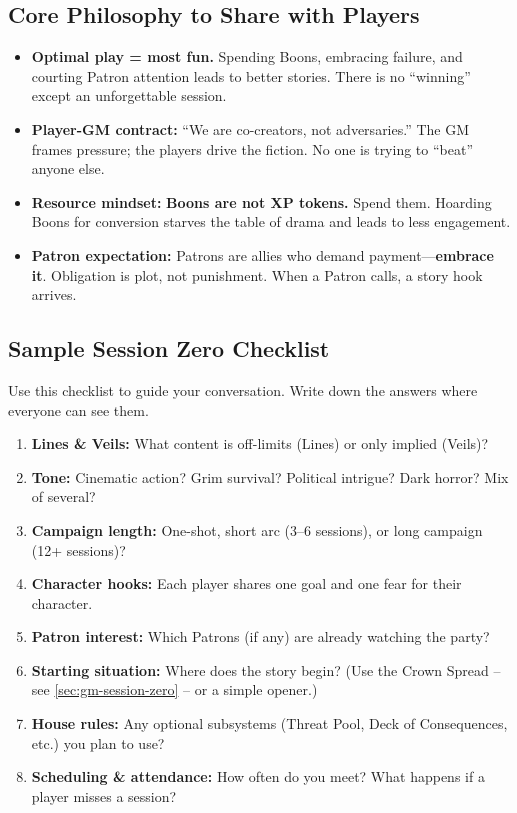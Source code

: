 \subsection{Core Philosophy to Share with Players}
\label{sub:gm-core-philosophy-players}

\begin{itemize}
    \item \textbf{Optimal play = most fun.} Spending Boons, embracing failure, and courting Patron attention leads to better stories. There is no ``winning'' except an unforgettable session.
    \item \textbf{Player-GM contract:} ``We are co-creators, not adversaries.'' The GM frames pressure; the players drive the fiction. No one is trying to ``beat'' anyone else.
    \item \textbf{Resource mindset:} \textbf{Boons are not XP tokens.} Spend them. Hoarding Boons for conversion starves the table of drama and leads to less engagement.
    \item \textbf{Patron expectation:} Patrons are allies who demand payment---\textbf{embrace it}. Obligation is plot, not punishment. When a Patron calls, a story hook arrives.
\end{itemize}

\subsection{Sample Session Zero Checklist}
\label{sub:gm-session-zero-checklist}

Use this checklist to guide your conversation. Write down the answers where everyone can see them.

\begin{enumerate}
    \item \textbf{Lines \& Veils:} What content is off-limits (Lines) or only implied (Veils)?
    \item \textbf{Tone:} Cinematic action? Grim survival? Political intrigue? Dark horror? Mix of several?
    \item \textbf{Campaign length:} One-shot, short arc (3--6 sessions), or long campaign (12+ sessions)?
    \item \textbf{Character hooks:} Each player shares one goal and one fear for their character.
    \item \textbf{Patron interest:} Which Patrons (if any) are already watching the party?
    \item \textbf{Starting situation:} Where does the story begin? (Use the Crown Spread -- see \ref{sec:gm-session-zero} -- or a simple opener.)
    \item \textbf{House rules:} Any optional subsystems (Threat Pool, Deck of Consequences, etc.) you plan to use?
    \item \textbf{Scheduling \& attendance:} How often do you meet? What happens if a player misses a session?
\end{enumerate}


